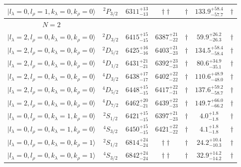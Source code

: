 \begin{tabular}{c c| c c c c c }
$\vert l_{\lambda}\!\!=\!0, l_{\rho}\!\!=\!1, k_{\lambda}\!\!=\!0, k_{\rho}\!\!=\!0 \rangle$ & $^{2}P_{3/2}$ & $6311^{+13}_{-13}$ & $\dagger\dagger$ & $\dagger$ & $133.9^{+58.4}_{-57.7}$ & $\dagger$ \\ 
\hline
 $N=2$  &  &  &  &  &  \\ 
$\vert l_{\lambda}\!\!=\!2, l_{\rho}\!\!=\!0, k_{\lambda}\!\!=\!0, k_{\rho}\!\!=\!0 \rangle$ & $^{2}D_{3/2}$ & $6415^{+15}_{-15}$ & $6387^{+21}_{-22}$ & $\dagger$ & $59.9^{+26.2}_{-26.3}$ & $\dagger$ \\ 
$\vert l_{\lambda}\!\!=\!2, l_{\rho}\!\!=\!0, k_{\lambda}\!\!=\!0, k_{\rho}\!\!=\!0 \rangle$ & $^{2}D_{5/2}$ & $6425^{+16}_{-16}$ & $6403^{+21}_{-23}$ & $\dagger$ & $134.5^{+58.4}_{-58.4}$ & $\dagger$ \\ 
$\vert l_{\lambda}\!\!=\!2, l_{\rho}\!\!=\!0, k_{\lambda}\!\!=\!0, k_{\rho}\!\!=\!0 \rangle$ & $^{4}D_{1/2}$ & $6431^{+21}_{-21}$ & $6392^{+23}_{-23}$ & $\dagger$ & $80.6^{+34.9}_{-35.1}$ & $\dagger$ \\ 
$\vert l_{\lambda}\!\!=\!2, l_{\rho}\!\!=\!0, k_{\lambda}\!\!=\!0, k_{\rho}\!\!=\!0 \rangle$ & $^{4}D_{3/2}$ & $6438^{+17}_{-17}$ & $6402^{+22}_{-22}$ & $\dagger$ & $110.6^{+48.9}_{-48.0}$ & $\dagger$ \\ 
$\vert l_{\lambda}\!\!=\!2, l_{\rho}\!\!=\!0, k_{\lambda}\!\!=\!0, k_{\rho}\!\!=\!0 \rangle$ & $^{4}D_{5/2}$ & $6448^{+15}_{-15}$ & $6417^{+22}_{-21}$ & $\dagger$ & $137.6^{+59.2}_{-58.7}$ & $\dagger$ \\ 
$\vert l_{\lambda}\!\!=\!2, l_{\rho}\!\!=\!0, k_{\lambda}\!\!=\!0, k_{\rho}\!\!=\!0 \rangle$ & $^{4}D_{7/2}$ & $6462^{+20}_{-21}$ & $6439^{+22}_{-23}$ & $\dagger$ & $149.7^{+66.0}_{-66.2}$ & $\dagger$ \\ 
$\vert l_{\lambda}\!\!=\!0, l_{\rho}\!\!=\!0, k_{\lambda}\!\!=\!1, k_{\rho}\!\!=\!0 \rangle$ & $^{2}S_{1/2}$ & $6421^{+15}_{-15}$ & $6397^{+21}_{-23}$ & $\dagger$ & $4.0^{+1.8}_{-1.8}$ & $\dagger$ \\ 
$\vert l_{\lambda}\!\!=\!0, l_{\rho}\!\!=\!0, k_{\lambda}\!\!=\!1, k_{\rho}\!\!=\!0 \rangle$ & $^{4}S_{3/2}$ & $6450^{+15}_{-15}$ & $6421^{+22}_{-22}$ & $\dagger$ & $4.1^{+1.8}_{-1.8}$ & $\dagger$ \\ 
$\vert l_{\lambda}\!\!=\!0, l_{\rho}\!\!=\!0, k_{\lambda}\!\!=\!0, k_{\rho}\!\!=\!1 \rangle$ & $^{2}S_{1/2}$ & $6814^{+24}_{-24}$ & $\dagger\dagger$ & $\dagger$ & $24.2^{+10.4}_{-10.3}$ & $\dagger$ \\ 
$\vert l_{\lambda}\!\!=\!0, l_{\rho}\!\!=\!0, k_{\lambda}\!\!=\!0, k_{\rho}\!\!=\!1 \rangle$ & $^{4}S_{3/2}$ & $6842^{+24}_{-24}$ & $\dagger\dagger$ & $\dagger$ & $32.9^{+14.2}_{-14.2}$ & $\dagger$ \\ 

\end{tabular}
